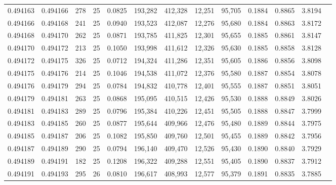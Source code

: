 \begin{tabular}{rrrrrrrrrrrrr}
0.494163 & 0.494166 &   278 &  25 &                                     0.0825 & 193,282 & 412,328 &  12,251 &  95,705 & 0.1884 & 0.8865 & 3.8194 \\
0.494166 & 0.494168 &   241 &  25 &                                     0.0940 & 193,523 & 412,087 &  12,276 &  95,680 & 0.1884 & 0.8863 & 3.8172 \\
0.494168 & 0.494170 &   262 &  25 &                                     0.0871 & 193,785 & 411,825 &  12,301 &  95,655 & 0.1885 & 0.8861 & 3.8147 \\
0.494170 & 0.494172 &   213 &  25 &                                     0.1050 & 193,998 & 411,612 &  12,326 &  95,630 & 0.1885 & 0.8858 & 3.8128 \\
0.494172 & 0.494175 &   326 &  25 &                                     0.0712 & 194,324 & 411,286 &  12,351 &  95,605 & 0.1886 & 0.8856 & 3.8098 \\
0.494175 & 0.494176 &   214 &  25 &                                     0.1046 & 194,538 & 411,072 &  12,376 &  95,580 & 0.1887 & 0.8854 & 3.8078 \\
0.494176 & 0.494179 &   294 &  25 &                                     0.0784 & 194,832 & 410,778 &  12,401 &  95,555 & 0.1887 & 0.8851 & 3.8051 \\
0.494179 & 0.494181 &   263 &  25 &                                     0.0868 & 195,095 & 410,515 &  12,426 &  95,530 & 0.1888 & 0.8849 & 3.8026 \\
0.494181 & 0.494183 &   289 &  25 &                                     0.0796 & 195,384 & 410,226 &  12,451 &  95,505 & 0.1888 & 0.8847 & 3.7999 \\
0.494183 & 0.494185 &   260 &  25 &                                     0.0877 & 195,644 & 409,966 &  12,476 &  95,480 & 0.1889 & 0.8844 & 3.7975 \\
0.494185 & 0.494187 &   206 &  25 &                                     0.1082 & 195,850 & 409,760 &  12,501 &  95,455 & 0.1889 & 0.8842 & 3.7956 \\
0.494187 & 0.494189 &   290 &  25 &                                     0.0794 & 196,140 & 409,470 &  12,526 &  95,430 & 0.1890 & 0.8840 & 3.7929 \\
0.494189 & 0.494191 &   182 &  25 &                                     0.1208 & 196,322 & 409,288 &  12,551 &  95,405 & 0.1890 & 0.8837 & 3.7912 \\
0.494191 & 0.494193 &   295 &  26 &                                     0.0810 & 196,617 & 408,993 &  12,577 &  95,379 & 0.1891 & 0.8835 & 3.7885 \\

\end{tabular}
